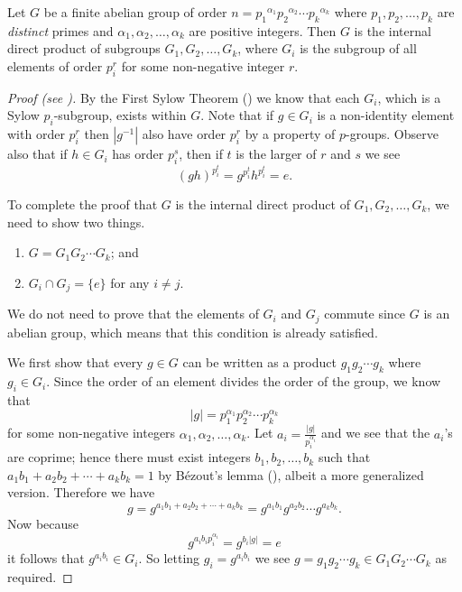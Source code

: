 \begin{lemma}\label{lemma-fundamental-theorem-of-finite-abelian-groups-1}
    Let $G$ be a finite abelian group of order $n = {p_1}^{\alpha_1}{p_2}^{\alpha_2}\cdots{p_k}^{\alpha_k}$ where $p_1, p_2, \dots, p_k$ are \textit{distinct} primes and $\alpha_1, \alpha_2, \dots, \alpha_k$ are positive integers. Then $G$ is the internal direct product of subgroups $G_1, G_2, \dots, G_k$, where $G_i$ is the subgroup of all elements of order $p_i^r$ for some non-negative integer $r$.
\end{lemma}
\begin{proof}[Proof (see {\cite[Lemma 13.8]{judson_beezer_2022}})]
    By the First Sylow Theorem () we know that each $G_i$, which is a Sylow $p_i$-subgroup, exists within $G$. Note that if $g \in G_i$ is a non-identity element with order $p_i^r$ then $|g^{-1}|$ also have order $p_i^r$ by a property of $p$-groups. Observe also that if $h \in G_i$ has order $p_i^s$, then if $t$ is the larger of $r$ and $s$ we see
    \[
        (gh)^{p_i^t} = g^{p_i^t}h^{p_i^t} = e.
    \]
    
    To complete the proof that $G$ is the internal direct product of $G_1, G_2, \dots, G_k$, we need to show two things.
    \begin{enumerate}
        \item $G = G_1G_2\cdots G_k$; and
        \item $G_i \cap G_j = \{e\}$ for any $i \neq j$.
    \end{enumerate}
    We do not need to prove that the elements of $G_i$ and $G_j$ commute since $G$ is an abelian group, which means that this condition is already satisfied.

    We first show that every $g \in G$ can be written as a product $g_1g_2\cdots g_k$ where $g_i \in G_i$. Since the order of an element divides the order of the group, we know that
    \[
        |g| = p_1^{\alpha_1}p_2^{\alpha_2}\cdots p_k^{\alpha_k}
    \]
    for some non-negative integers $\alpha_1, \alpha_2, \dots, \alpha_k$. Let $a_i = \frac{|g|}{p_i^{\alpha_i}}$ and we see that the $a_i$'s are coprime; hence there must exist integers $b_1, b_2, \dots, b_k$ such that $a_1b_1 + a_2b_2 + \cdots + a_kb_k = 1$ by B\'ezout's lemma (), albeit a more generalized version. Therefore we have
    \[
        g = g^{a_1b_1 + a_2b_2 + \cdots + a_kb_k} = g^{a_1b_1}g^{a_2b_2}\cdots g^{a_kb_k}.
    \]
    Now because
    \[
        g^{a_ib_ip_i^{\alpha_i}} = g^{b_i|g|} = e
    \]
    it follows that $g^{a_ib_i} \in G_i$. So letting $g_i = g^{a_ib_i}$ we see $g = g_1g_2\cdots g_k \in G_1G_2\cdots G_k$ as required.


\end{proof}
